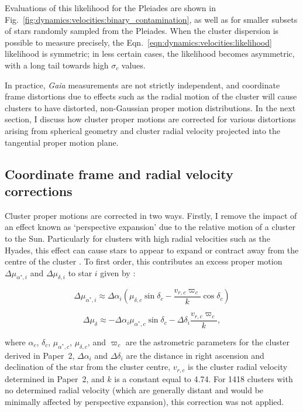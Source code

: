 Evaluations of this likelihood for the Pleiades are shown in Fig.~\ref{fig:dynamics:velocities:binary_contamination}, as well as for smaller subsets of stars randomly sampled from the Pleiades. When the cluster dispersion is possible to measure precisely, the Eqn.~\ref{eqn:dynamics:velocities:likelihood} likelihood is symmetric; in less certain cases, the likelihood becomes asymmetric, with a long tail towards high $\sigma_c$ values.

In practice, \emph{Gaia} measurements are not strictly independent, and coordinate frame distortions due to effects such as the radial motion of the cluster will cause clusters to have distorted, non-Gaussian proper motion distributions. In the next section, I discuss how cluster proper motions are corrected for various distortions arising from spherical geometry and cluster radial velocity projected into the tangential proper motion plane.


\subsection{Coordinate frame and radial velocity corrections}
\label{sec:dynamics:velocities:correction}

Cluster proper motions are corrected in two ways. Firstly, I remove the impact of an effect known as `perspective expansion' due to the relative motion of a cluster to the Sun. Particularly for clusters with high radial velocities such as the Hyades, this effect can cause stars to appear to expand or contract away from the centre of the cluster \citep{kuhn_kinematics_2019}. To first order, this contributes an excess proper motion $\Delta \mu_{\alpha^*,i}$ and $\Delta \mu_{\delta,i}$ to star $i$ given by \citep{vanleeuwen_parallaxes_proper_2009}:

\begin{equation}
    \Delta \mu_{\alpha^*,i} \approx \Delta\alpha_i \left( 
        \mu_{\delta,c} \sin\delta_c - \frac{v_{r,c} \varpi_c}{k}\cos\delta_c
    \right)
\end{equation}

\begin{equation}
    \Delta \mu_{\delta} \approx -\Delta\alpha_i \mu_{\alpha^*,c} \sin\delta_c - \Delta\delta_i \frac{v_{r,c}\varpi_c}{k},
\end{equation}

\noindent
where $\alpha_c$, $\delta_c$, $\mu_{\alpha^*,c}$, $\mu_{\delta,c}$, and $\varpi_c$ are the astrometric parameters for the cluster derived in Paper~2, $\Delta\alpha_i$ and $\Delta\delta_i$ are the distance in right ascension and declination of the star from the cluster centre, $v_{r,c}$ is the cluster radial velocity determined in Paper~2, and $k$ is a constant equal to 4.74. For 1418 clusters with no determined radial velocity (which are generally distant and would be minimally affected by perspective expansion), this correction was not applied.

